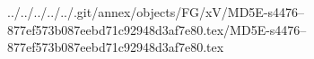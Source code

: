 ../../../../../.git/annex/objects/FG/xV/MD5E-s4476--877ef573b087eebd71c92948d3af7e80.tex/MD5E-s4476--877ef573b087eebd71c92948d3af7e80.tex